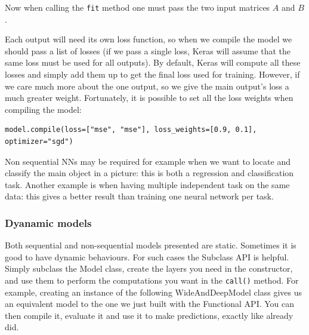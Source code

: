 \documentclass[12pt, letterpaper]{article}
\theoremstyle{definition}
\begin{document}
Now when calling the \lstinline+fit+ method one must pass the two input matrices $A$ and $B$.

Each output will need its own loss function, so when we compile the model we should pass a list of losses (if we pass a single loss, Keras will assume that the same loss must be used for all outputs). By default, Keras will compute all these losses and simply add them up to get the final loss used for training. However, if we care much more about the one output, so we give the main output's loss a much greater weight. Fortunately, it is possible to set all the loss weights when compiling the model:
\begin{lstlisting}
model.compile(loss=["mse", "mse"], loss_weights=[0.9, 0.1], optimizer="sgd")
\end{lstlisting}
				
Non sequential NNs may be required for example when we want to locate and classify the main object in a picture: this is both a regression and classification task. Another example is when having multiple independent task on the same data: this gives a better result than training one neural network per task.

\subsubsection{Dyanamic models}
Both sequential and non-sequential models presented are static. Sometimes it is good to have dynamic behaviours. For such cases the Subclass API is helpful. Simply subclass the Model class, create the layers you need in the constructor, and use them to perform the computations you want in the \lstinline+call()+ method. For example, creating an instance of the following WideAndDeepModel class gives us an equivalent model to the one we just built with the Functional API. You can then compile it, evaluate it and use it to make predictions, exactly like already did.
\end{document}
